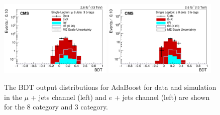 \begin{figure}[ht!]
    \includegraphics[width=0.48\textwidth]{images/Run2/BDT_Mu29Aug400trees_5MinNodeSize_20nCuts_3MaxDepth_5adaboostbeta_adaBoost_alphaSTune_noMinEvents8nJets3nMtags_StackLogY.pdf}
    \includegraphics[width=0.48\textwidth]{images/Run2/BDT_El29Aug400trees_5MinNodeSize_20nCuts_3MaxDepth_5adaboostbeta_adaBoost_alphaSTune_noMinEvents8nJets3nMtags_StackLogY.pdf} 
    \caption{The BDT output distributions for AdaBoost for data and simulation in the $\mu$ + jets channel (left) and $e$ + jets channel (left) are shown for the 8 \njets category and 3 \nMtags category.}
    \label{fig:BDT_Mu29Aug400trees_5MinNodeSize_20nCuts_3MaxDepth_5adaboostbeta_adaBoost_alphaSTune_noMinEvents83}
\end{figure}


